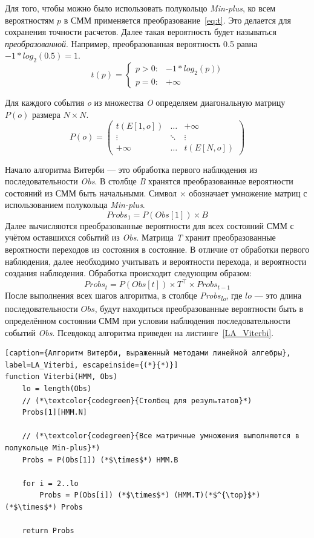 Для того, чтобы можно было использовать полукольцо \emph{Min-plus}, 
ко всем вероятностям $p$ в СММ применяется 
преобразование~\ref{eq:t}.
Это делается для сохранения точности расчетов.
Далее такая вероятность будет называться \emph{преобразованной}.
Например, преобразованная вероятность 0.5
равна $-1 * log_2(0.5) = 1$.
\begin{equation}
t(p) =
	\begin{cases}
	p > 0: & -1 * log_{2}(p))\\
	p = 0: & +\infty
	\end{cases}       
  \label{eq:t}
\end{equation}

Для каждого события \emph{o} из множества \emph{O} 
определяем диагональную матрицу $P(o)$ размера $N \times N$.
\[
  P(o) =
  \begin{pmatrix}
    t(E[1,o]) & \hdots & +\infty \\
    \vdots & \ddots & \vdots\\
    +\infty & \hdots & t(E[N,o])
  \end{pmatrix}
\]

Начало алгоритма Витерби --- это обработка первого наблюдения 
из последовательности \emph{Obs}.
В столбце \emph{B} хранятся преобразованные вероятности 
состояний из СММ быть начальными.
Символ $\times$ обозначает умножение матриц с использованием 
полукольца \emph{Min-plus}.
\[Probs_{1} = P(Obs[1]) \times B\]
Далее вычисляются преобразованные вероятности для всех 
состояний СММ с учётом ос\-тавшихся событий из \emph{Obs}.
Матрица \emph{T} хранит преобразованные вероятности 
переходов из состояния в состояние.
В отличие от обработки первого наблюдения, далее необходимо 
учитывать и вероятности перехода, и вероятности создания 
наблюдения.
Обработка происходит следующим образом:
\[Probs_{t} = P(Obs[t]) \times T^{\top} \times Probs_{t - 1}\]
После выполнения всех шагов алгоритма, в столбце 
\emph{Probs\textsubscript{lo}}, где $lo$ --- это длина 
последовательности $Obs$, будут находиться преобразованные 
вероятности быть в определённом состоянии СММ при условии 
наблюдения последовательности событий \emph{Obs}.
Псевдокод алгоритма приведен на листинге~\ref{LA_Viterbi}.
\begin{lstlisting}[caption={Алгоритм Витерби, выраженный методами линейной алгебры}, label=LA_Viterbi, escapeinside={(*}{*)}]
function Viterbi(HMM, Obs)
	lo = length(Obs)
	// (*\textcolor{codegreen}{Столбец для результатов}*)
	Probs[1][HMM.N]

	// (*\textcolor{codegreen}{Все матричные умножения выполняются в полукольце Min-plus}*)
	Probs = P(Obs[1]) (*$\times$*) HMM.B
	
	for i = 2..lo
		Probs = P(Obs[i]) (*$\times$*) (HMM.T)(*$^{\top}$*) (*$\times$*) Probs
		
	return Probs
\end{lstlisting}



